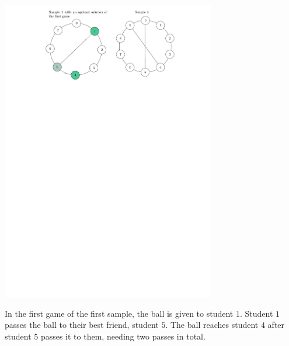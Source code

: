 \begin{center}
    \includegraphics[width=0.7\textwidth]{sample1_4.pdf}
\end{center}

In the first game of the first sample, the ball is given to student $1$.
Student $1$ passes the ball to their best friend, student $5$.
The ball reaches student $4$ after student $5$ passes it to them, needing two passes in total.